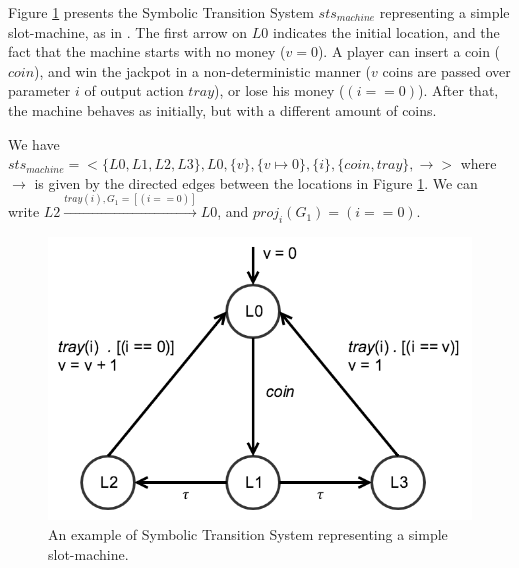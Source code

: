 \begin{example}
    Figure \ref{fig:sts-example} presents the Symbolic Transition
    System $sts_{machine}$ representing a simple slot-machine, as
    in \cite{FTW05}. The first arrow on $L0$ indicates the
    initial location, and the fact that the machine starts with
    no money ($v = 0$). A player can insert a coin ($coin$), and
    win the jackpot in a non-deterministic manner ($v$ coins are
    passed over parameter $i$ of output action $tray$), or lose
    his money ($(i == 0)$). After that, the machine behaves as
    initially, but with a different amount of coins.

    We have $sts_{machine} = <\{L0, L1, L2, L3\}, L0, \{ v \}, \{
    v \mapsto 0 \}, \{ i \}, \{ coin, tray \}, \rightarrow >$
    where $\rightarrow$ is given by the directed edges between
    the locations in Figure \ref{fig:sts-example}.  We can write
    $L2 \xrightarrow{tray(i), G_{1} = [(i == 0)]} L0$, and
    $proj_{i}(G_{1}) = (i == 0)$.

    \begin{figure}[ht]
        \begin{center}
            \includegraphics[width=0.7\linewidth]{figures/sts-example.png}
        \end{center}

        \caption{An example of Symbolic Transition System
        representing a simple slot-machine.}
        \label{fig:sts-example}
    \end{figure}

    \label{example:sts}
\end{example}

